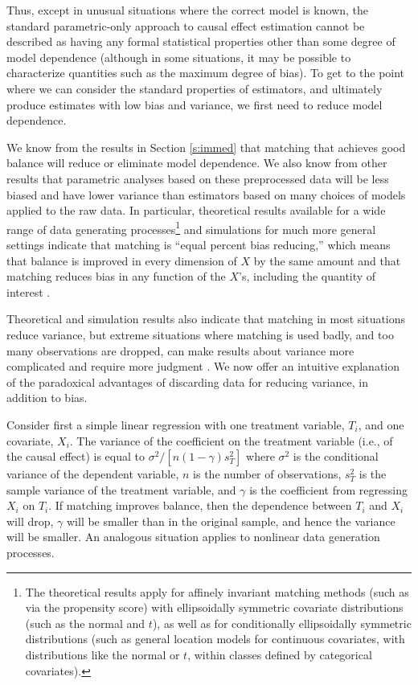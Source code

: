 \documentclass[11pt,titlepage]{article}
\begin{document}
Thus, except in unusual situations where the correct model is known,
the standard parametric-only approach to causal effect estimation
cannot be described as having any formal statistical properties other
than some degree of model dependence (although in some situations, it
may be possible to characterize quantities such as the maximum degree
of bias).  To get to the point where we can consider the standard
properties of estimators, and ultimately produce estimates with low
bias and variance, we first need to reduce model dependence.

We know from the results in Section \ref{s:immed} that matching that
achieves good balance will reduce or eliminate model dependence.  We
also know from other results that parametric analyses based on these
preprocessed data will be less biased and have lower variance than
estimators based on many choices of models applied to the raw data.
In particular, theoretical results available for a wide range of data
generating processes\footnote{The theoretical results apply for
  affinely invariant matching methods (such as via the propensity
  score) with ellipsoidally symmetric covariate distributions (such as
  the normal and $t$), as well as for conditionally ellipsoidally
  symmetric distributions (such as general location models for
  continuous covariates, with distributions like the normal or $t$,
  within classes defined by categorical covariates).} and simulations
for much more general settings \citep{RubTho96, RubStu06} indicate
that matching is ``equal percent bias reducing,'' which means that
balance is improved in every dimension of $X$ by the same amount and
that matching reduces bias in any function of the $X$'s, including the
quantity of interest \citep{RubTho92,RubTho96}.

Theoretical and simulation results also indicate that matching in most
situations reduce variance, but extreme situations where matching is
used badly, and too many observations are dropped, can make results
about variance more complicated and require more judgment
\citep{RubTho96}.  We now offer an intuitive explanation of the
paradoxical advantages of discarding data for reducing variance, in
addition to bias.

Consider first a simple linear regression with one treatment variable,
$T_i$, and one covariate, $X_i$.  The variance of the coefficient on
the treatment variable (i.e., of the causal effect) is equal to
$\sigma^2/[n (1-\gamma) s^2_T]$ where $\sigma^2$ is the conditional
variance of the dependent variable, $n$ is the number of observations,
$s^2_T$ is the sample variance of the treatment variable, and $\gamma$
is the coefficient from regressing $X_i$ on $T_i$.  If matching
improves balance, then the dependence between $T_i$ and $X_i$ will
drop, $\gamma$ will be smaller than in the original sample, and hence
the variance will be smaller.  An analogous situation applies to
nonlinear data generation processes.
\end{document}
